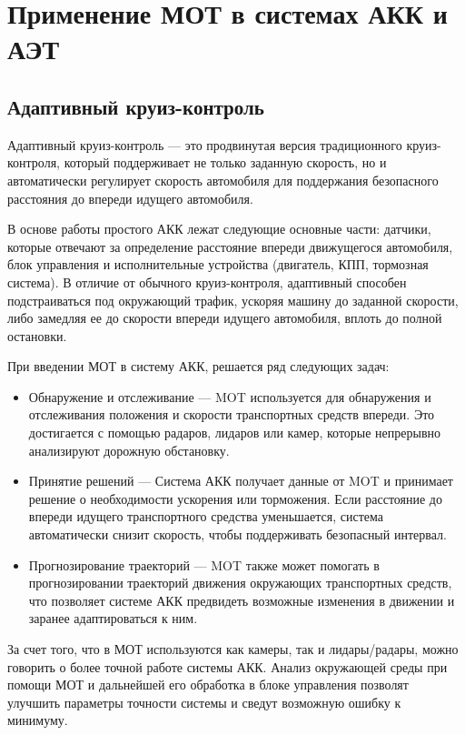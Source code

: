\chapter{Применение МОТ в системах АКК и АЭТ}

\section{Адаптивный круиз-контроль}
Адаптивный круиз-контроль --- это продвинутая версия традиционного круиз-контроля, который поддерживает не только заданную скорость, но и автоматически регулирует скорость автомобиля для поддержания безопасного расстояния до впереди идущего автомобиля.

В основе работы простого АКК лежат следующие основные части: датчики, которые отвечают за определение расстояние впереди движущегося автомобиля, блок управления и исполнительные устройства (двигатель, КПП, тормозная система). В отличие от обычного круиз-контроля, адаптивный способен подстраиваться под окружающий трафик, ускоряя машину до заданной скорости, либо замедляя ее до скорости впереди идущего автомобиля, вплоть до полной остановки.

При введении МОТ в систему АКК, решается ряд следующих задач:

\begin{itemize}

	\item Обнаружение и отслеживание --- MOT используется для обнаружения и отслеживания положения и скорости транспортных средств впереди. Это достигается с помощью радаров, лидаров или камер, которые непрерывно анализируют дорожную обстановку.

	\item Принятие решений --- Система АКК получает данные от MOT и принимает решение о необходимости ускорения или торможения. Если расстояние до впереди идущего транспортного средства уменьшается, система автоматически снизит скорость, чтобы поддерживать безопасный интервал.

	\item Прогнозирование траекторий --- MOT также может помогать в прогнозировании траекторий движения окружающих транспортных средств, что позволяет системе АКК предвидеть возможные изменения в движении и заранее адаптироваться к ним.

\end{itemize}

За счет того, что в МОТ используются как камеры, так и лидары/радары, можно говорить о более точной работе системы АКК. Анализ окружающей среды при помощи МОТ и дальнейшей его обработка в блоке управления позволят улучшить параметры точности системы и сведут возможную ошибку к минимуму. 

